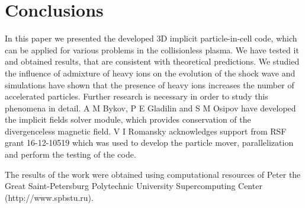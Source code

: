 \section{Conclusions}
In this paper we presented the developed 3D implicit particle-in-cell code, which can be applied for various problems in the collisionless plasma. We have tested it and obtained results, that are consistent with theoretical predictions. We studied the influence of admixture of heavy ions on the evolution of the shock wave and simulations have shown that the presence of heavy ions increases the number of accelerated particles. Further research is necessary in order to study this phenomena in detail.
\ack
A M Bykov, P E  Gladilin and S M  Osipov have developed the implicit fields solver module, which provides conservation of the divergenceless magnetic field. 
V I Romansky acknowledges support from RSF grant 16-12-10519 which was used to develop the
particle mover, parallelization and perform the testing of the code.


The results of the work were obtained using computational resources of Peter the Great Saint-Petersburg Polytechnic University Supercomputing Center (http://www.spbstu.ru).